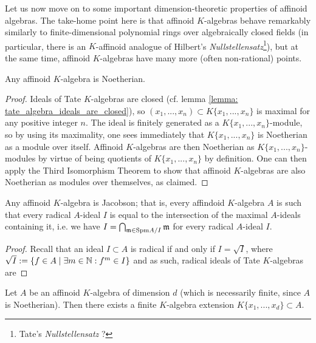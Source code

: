             Let us now move on to some important dimension-theoretic properties of affinoid algebras. The take-home point here is that affinoid $K$-algebras behave remarkably similarly to finite-dimensional polynomial rings over algebraically closed fields (in particular, there is an $K$-affinoid analogue of Hilbert's \textit{Nullstellensatz}\footnote{Tate's \textit{Nullstellensatz} ?}), but at the same time, affinoid $K$-algebras have many more (often non-rational) points.
            \begin{proposition} \label{prop: affinoid_algebras_are_noetherian}
                Any affinoid $K$-algebra is Noetherian.
            \end{proposition}
                \begin{proof}
                    Ideals of Tate $K$-algebras are closed (cf. lemma \ref{lemma: tate_algebra_ideals_are_closed}), so $(x_1, ..., x_n) \subset K\{x_1, ..., x_n\}$ is maximal for any positive integer $n$. The ideal is finitely generated as a $K\{x_1, ..., x_n\}$-module, so by using its maximality, one sees immediately that $K\{x_1, ..., x_n\}$ is Noetherian as a module over itself. Affinoid $K$-algebras are then Noetherian as $K\{x_1, ..., x_n\}$-modules by virtue of being quotients of $K\{x_1, ..., x_n\}$ by definition. One can then apply the Third Isomorphism Theorem to show that affinoid $K$-algebras are also Noetherian as modules over themselves, as claimed.
                \end{proof}
            \begin{proposition} \label{prop: affinoid_algebras_are_jacobson}
                Any affinoid $K$-algebra is Jacobson; that is, every affindoid $K$-algebra $A$ is such that every radical $A$-ideal $I$ is equal to the intersection of the maximal $A$-ideals containing it, i.e. we have $I = \bigcap_{\mathfrak{m} \in \mathrm{Spm} A/I} \mathfrak{m}$ for every radical $A$-ideal $I$.
            \end{proposition}
                \begin{proof}
                    Recall that an ideal $I \subset A$ is radical if and only if $I = \sqrt{I}$, where $\sqrt{I} := \{f \in A \mid \exists m \in \mathbb{N}: f^m \in I\}$ and as such, radical ideals of Tate $K$-algebras are 
                \end{proof}
            \begin{proposition} \label{prop: affinoid_algebras_admit_noetherian_normalisation}
                Let $A$ be an affinoid $K$-algebra of dimension $d$ (which is necessarily finite, since $A$ is Noetherian). Then there exists a finite $K$-algebra extension $K\{x_1, ..., x_d\} \subset A$.
            \end{proposition}
